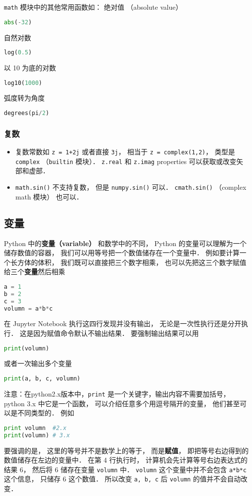 \verb|math| 模块中的其他常用函数如： 绝对值 （absolute value）
\begin{lstlisting}[language=python]
abs(-32)
\end{lstlisting}
自然对数
\begin{lstlisting}[language=python]
log(0.5)
\end{lstlisting}
以 10 为底的对数
\begin{lstlisting}[language=python]
log10(1000)
\end{lstlisting}
弧度转为角度
\begin{lstlisting}[language=python]
degrees(pi/2)
\end{lstlisting}

\subsubsection{复数}
\begin{itemize}
\item 复数常数如 \verb|z = 1+2j| 或者直接 \verb|3j|， 相当于 \verb|z = complex(1,2)|， 类型是 \verb|complex| （\verb|builtin| 模块）． \verb|z.real| 和 \verb|z.imag| properties 可以获取或改变矢部和虚部．
\item \verb|math.sin()| 不支持复数， 但是 \verb|numpy.sin()| 可以． \verb|cmath.sin()| （complex math 模块） 也可以．
\end{itemize}

\subsection{变量}
Python 中的\textbf{变量（variable）} 和数学中的不同， Python 的变量可以理解为一个储存数值的容器， 我们可以用等号把一个数值储存在一个变量中． 例如要计算一个长方体的体积， 我们既可以直接把三个数字相乘， 也可以先把这三个数字赋值给三个\textbf{变量}然后相乘
\begin{lstlisting}[language=python]
a = 1
b = 2
c = 3
volumn = a*b*c
\end{lstlisting}
在 Jupyter Notebook 执行这四行发现并没有输出， 无论是一次性执行还是分开执行． 这是因为赋值命令默认不输出结果． 要强制输出结果可以用
\begin{lstlisting}[language=python]
print(volumn)
\end{lstlisting}
或者一次输出多个变量
\begin{lstlisting}[language=python]
print(a, b, c, volumn)
\end{lstlisting}
注意：在python2.x版本中，\verb|print| 是一个关键字，输出内容不需要加括号， python 3.x 中它是一个函数， 可以介绍任意多个用逗号隔开的变量， 他们甚至可以是不同类型的． 例如
\begin{lstlisting}[language=python]
print volumn  #2.x
print(volumn) # 3.x
\end{lstlisting}
要强调的是， 这里的等号并不是数学上的等于， 而是\textbf{赋值}， 即把等号右边得到的数值储存在左边的变量中． 在第 4 行执行时， 计算机会先计算等号右边表达式的结果 6， 然后将 6 储存在变量 \verb|volumn| 中． \verb|volumn| 这个变量中并不会包含 \verb|a*b*c| 这个信息， 只储存 6 这个数值． 所以改变 \verb|a, b, c| 后 \verb|volumn| 的值并不会自动改变．

